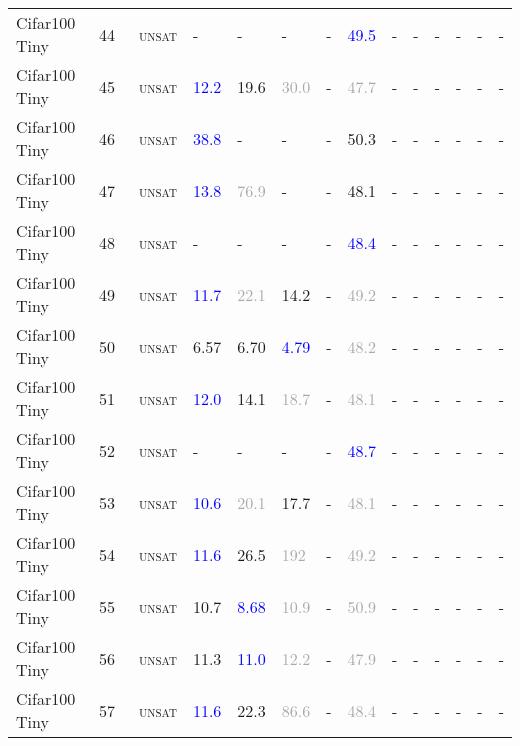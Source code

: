 \begin{center}
{\begin{longtable}{@{}llllllllllllll@{}}
Cifar100 Tiny & 44 & ~\textsc{unsat} & - & - & - & - & \textcolor{blue}{49.5} & - & - & - & - & - & - \\
Cifar100 Tiny & 45 & ~\textsc{unsat} & \textcolor{blue}{12.2} & \textcolor{second}{19.6} & \textcolor{darkgray}{30.0} & - & \textcolor{darkgray}{47.7} & - & - & - & - & - & - \\
Cifar100 Tiny & 46 & ~\textsc{unsat} & \textcolor{blue}{38.8} & - & - & - & \textcolor{second}{50.3} & - & - & - & - & - & - \\
Cifar100 Tiny & 47 & ~\textsc{unsat} & \textcolor{blue}{13.8} & \textcolor{darkgray}{76.9} & - & - & \textcolor{second}{48.1} & - & - & - & - & - & - \\
Cifar100 Tiny & 48 & ~\textsc{unsat} & - & - & - & - & \textcolor{blue}{48.4} & - & - & - & - & - & - \\
Cifar100 Tiny & 49 & ~\textsc{unsat} & \textcolor{blue}{11.7} & \textcolor{darkgray}{22.1} & \textcolor{second}{14.2} & - & \textcolor{darkgray}{49.2} & - & - & - & - & - & - \\
Cifar100 Tiny & 50 & ~\textsc{unsat} & \textcolor{second}{6.57} & \textcolor{second}{6.70} & \textcolor{blue}{4.79} & - & \textcolor{darkgray}{48.2} & - & - & - & - & - & - \\
Cifar100 Tiny & 51 & ~\textsc{unsat} & \textcolor{blue}{12.0} & \textcolor{second}{14.1} & \textcolor{darkgray}{18.7} & - & \textcolor{darkgray}{48.1} & - & - & - & - & - & - \\
Cifar100 Tiny & 52 & ~\textsc{unsat} & - & - & - & - & \textcolor{blue}{48.7} & - & - & - & - & - & - \\
Cifar100 Tiny & 53 & ~\textsc{unsat} & \textcolor{blue}{10.6} & \textcolor{darkgray}{20.1} & \textcolor{second}{17.7} & - & \textcolor{darkgray}{48.1} & - & - & - & - & - & - \\
Cifar100 Tiny & 54 & ~\textsc{unsat} & \textcolor{blue}{11.6} & \textcolor{second}{26.5} & \textcolor{darkgray}{192} & - & \textcolor{darkgray}{49.2} & - & - & - & - & - & - \\
Cifar100 Tiny & 55 & ~\textsc{unsat} & \textcolor{second}{10.7} & \textcolor{blue}{8.68} & \textcolor{darkgray}{10.9} & - & \textcolor{darkgray}{50.9} & - & - & - & - & - & - \\
Cifar100 Tiny & 56 & ~\textsc{unsat} & \textcolor{second}{11.3} & \textcolor{blue}{11.0} & \textcolor{darkgray}{12.2} & - & \textcolor{darkgray}{47.9} & - & - & - & - & - & - \\
Cifar100 Tiny & 57 & ~\textsc{unsat} & \textcolor{blue}{11.6} & \textcolor{second}{22.3} & \textcolor{darkgray}{86.6} & - & \textcolor{darkgray}{48.4} & - & - & - & - & - & - \\

\end{longtable}}
\end{center}
